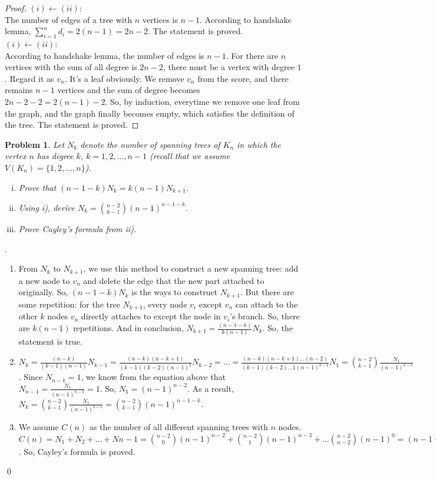 \documentclass[12pt]{article}
\newtheorem{hw}{Problem}
\newenvironment{sol}
  {\par\vspace{3mm}\noindent{\it Solution}.}
  {\qed}
\begin{document}
\begin{proof}
    $(i)\leftarrow (ii)$:\\
    The number of edges of a tree with $n$ vertices is $n-1$. According to handshake lemma, $\sum_{i=1}^{n}d_i=2(n-1)=2n-2$. The statement is proved.\\
    $(i)\leftarrow (ii)$:\\
    According to handshake lemma, the number of edges is $n-1$. For there are $n$ vertices with the sum of all degree is $2n-2$, there must be a vertex with degree $1$. Regard it as $v_n$. It's a leaf obviously.
    We remove $v_n$ from the score, and there remains $n-1$ vertices and the sum of degree becomes $2n-2-2=2(n-1)-2$. So, by induction, everytime we remove one leaf from the graph, and the graph finally becomes empty, which satisfies the definition of the tree. The statement is proved.
\end{proof}


\begin{hw}
  Let $N_k$ denote the number of spanning trees of $K_n$ in which the vertex $n$  has degree $k$, $k=1,2,\ldots, n-1$ (recall that we assume $V(K_n)=\{1,2,\ldots,n\}$).
  \begin{enumerate}[i)]
    \item Prove that $(n-1-k)N_k= k(n-1)N_{k+1}$.
    \item Using i), derive $N_k= {n-2 \choose k-1}(n-1)^{n-1-k}$.
    \item Prove Cayley's formula from ii).
  \end{enumerate}
\end{hw}

\begin{sol}
    \begin{enumerate}
        \item From $N_k$ to $N_{k+1}$, we use this method to construct a new spanning tree: add a new node to $v_n$ and delete the edge that the new part attached to originally. So, $(n-1-k)N_k$ is the ways to construct $N_{k+1}$. But there are some repetition: for the tree $N_{k+1}$, every node $v_i$ except $v_n$ can attach to the other $k$ nodes $v_n$ directly attaches to except the node in $v_i$'s branch. So, there are $k(n-1)$ repetitions. 
        And in conclusion, $N_{k+1}=\frac{(n-1-k)}{k(n-1)}N_k $. So, the statement is true.
        \item $N_k=\frac{(n-k)}{(k-1)(n-1)}N_{k-1}=\frac{(n-k)(n-k+1)}{(k-1)(k-2)(n-1)^2}N_{k-2}=\ldots =\frac{(n-k)(n-k+1)\ldots (n-2)}{(k-1)(k-2)\ldots 1(n-1)^{k-1}}N_1=\binom{n-2}{k-1}\frac{N_1}{(n-1)^{k-1}}  $. Since $N_{n-1}=1$, we know from the equation above that $N_{n-1}=\frac{N_1}{(n-1)^{n-2}}=1 $. So, $N_1=(n-1)^{n-2}$.
        As a result, $N_k=\binom{n-2}{k-1}\frac{N_1}{(n-1)^{k-1}}=\binom{n-2}{k-1}(n-1)^{n-1-k} $.
        \item We assume $C(n)$ as the number of all different spanning trees with $n$ nodes. $C(n)=N_1+N_2+\ldots +N{n-1}=\binom{n-2}{0}(n-1)^{n-2}+ \binom{n-2}{1}(n-1)^{n-3}+\ldots \binom{n-2}{n-2}(n-1)^0=(n-1+1)^{n-2}=n^{n-2}$. So, Cayley's formula is proved.
    \end{enumerate}
\end{sol}
\end{document}
